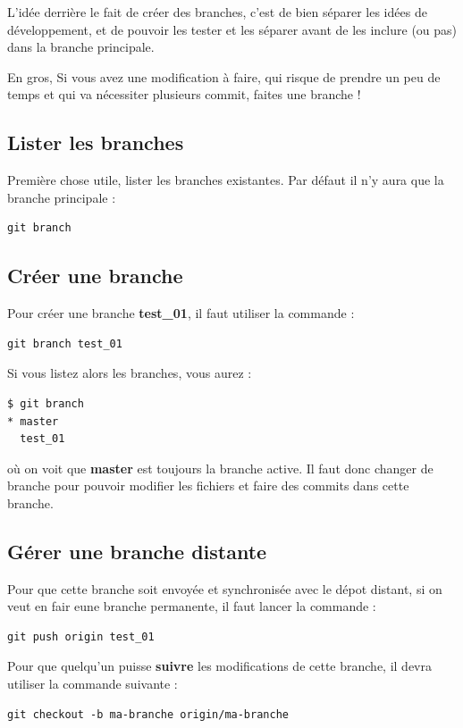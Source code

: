 \documentclass[a4paper,twoside]{article}
\begin{document}
L'idée derrière le fait de créer des branches, c'est de bien séparer les idées de développement, et de pouvoir les tester et les séparer avant de les inclure (ou pas) dans la branche principale. 

\begin{important}
En gros, Si vous avez une modification à faire, qui risque de prendre un peu de temps et qui va nécessiter plusieurs commit, faites une branche !
\end{important}


\subsection{Lister les branches}
Première chose utile, lister les branches existantes. Par défaut il n'y aura que la branche principale : 
\begin{verbatim}
git branch
\end{verbatim}

\subsection{Créer une branche}
Pour créer une branche \textbf{test\_01}, il faut utiliser la commande :
\begin{verbatim}
git branch test_01
\end{verbatim}

Si vous listez alors les branches, vous aurez :
\begin{verbatim}
$ git branch
* master
  test_01
\end{verbatim}
où on voit que \textbf{master} est toujours la branche active. Il faut donc changer de branche pour pouvoir modifier les fichiers et faire des commits dans cette branche.

\subsection{Gérer une branche distante}
Pour que cette branche soit envoyée et synchronisée avec le dépot distant, si on veut en fair eune branche permanente, il faut lancer la commande :
\begin{verbatim}
git push origin test_01
\end{verbatim}

Pour que quelqu'un puisse \textbf{suivre} les modifications de cette branche, il devra utiliser la commande suivante :
\begin{verbatim}
git checkout -b ma-branche origin/ma-branche
\end{verbatim}
\end{document}
